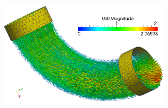 \documentclass[8pt]{beamer}
\newcommand{\buu}{\boldsymbol{u}}
\begin{document}
{\begin{columns}[c]
\begin{figure}[htbp]
\end{figure}
\begin{figure}[htbp]
    \includegraphics[scale=0.1]{TorusPrimal150.png}
\end{figure}
\end{columns}
}
\end{document}
